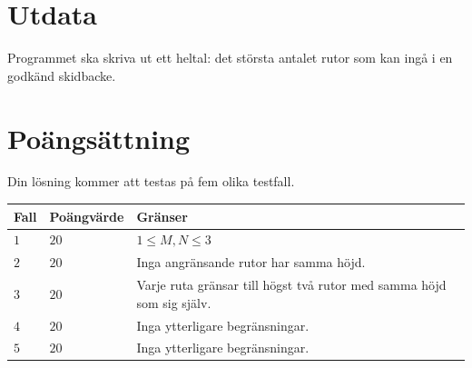 \section*{Utdata}
Programmet ska skriva ut ett heltal: det största antalet rutor som kan ingå i en godkänd skidbacke.

\section*{Poängsättning}
Din lösning kommer att testas på fem olika testfall.

\noindent
\begin{tabular}{| l | l | l |}
  \hline
  Fall & Poängvärde & Gränser \\ \hline
  $1$    & $20$        &  $1 \leq M, N \leq 3$\\ \hline 
  $2$    & $20$        &  Inga angränsande rutor har samma höjd. \\ \hline 
  $3$    & $20$        &  Varje ruta gränsar till högst två rutor med samma höjd som sig själv. \\ \hline
  $4$    & $20$        &  Inga ytterligare begränsningar. \\ \hline
  $5$    & $20$        &  Inga ytterligare begränsningar. \\ \hline
\end{tabular}

